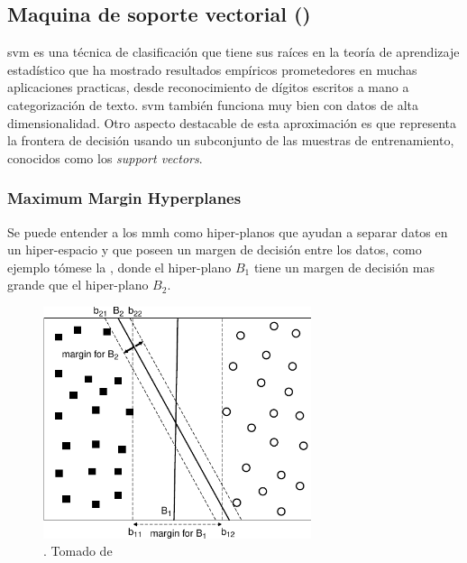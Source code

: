 \subsubsection{} \label{ch:kbs-rule-based-system}


\subsection{Maquina de soporte vectorial ()} \label{sec:SVM}
\gls{svm} es una técnica de clasificación que tiene sus raíces en la teoría de aprendizaje estadístico que ha mostrado resultados empíricos prometedores en muchas aplicaciones practicas, desde reconocimiento de dígitos escritos a mano a categorización de texto. \gls{svm} también funciona muy bien con datos de alta dimensionalidad. Otro aspecto destacable de esta aproximación es que representa la frontera de decisión usando un subconjunto de las muestras de entrenamiento, conocidos como los \emph{support vectors}.

\subsubsection{Maximum Margin Hyperplanes}
Se puede entender a los \gls{mmh} como hiper-planos que ayudan a separar datos en un hiper-espacio y que poseen un margen de decisión entre los datos, como ejemplo tómese la , donde el hiper-plano $B_1$ tiene un margen de decisión mas grande que el hiper-plano $B_2$.

\begin{figure}[H]
   \centering
   \includegraphics[width=0.7\textwidth]{Figures/svm-hyperplanes.pdf}
   \decoRule
   \caption[]{. Tomado de \cite{tan2005introduction}}
   \label{fig:svm-hyperplanes}
\end{figure}

